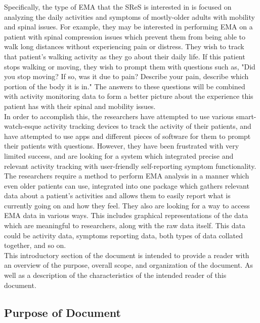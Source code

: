 \documentclass[12pt]{article}
\begin{document}
Specifically, the type of EMA that the SReS is interested in is focused on analyzing the daily activities and symptoms of mostly-older adults with mobility and spinal issues. For example, they may be interested in performing EMA on a patient with spinal compression issues which prevent them from being able to walk long distances without experiencing pain or distress. They wish to track that patient's walking activity as they go about their daily life. If this patient stops walking or moving, they wish to prompt them with questions such as, "Did you stop moving? If so, was it due to pain? Describe your pain, describe which portion of the body it is in." The answers to these questions will be combined with activity monitoring data to form a better picture about the experience this patient has with their spinal and mobility issues.\\

In order to accomplish this, the researchers have attempted to use various smart-watch-esque activity tracking devices to track the activity of their patients, and have attempted to use apps and different pieces of software for them to prompt their patients with questions. However, they have been frustrated with very limited success, and are looking for a system which integrated precise and relevant activity tracking with user-friendly self-reporting symptom functionality.\\

The researchers require a method to perform EMA analysis in a manner which even older patients can use, integrated into one package which gathers relevant data about a patient's activities and allows them to easily report what is currently going on and how they feel. They also are looking for a way to access EMA data in various ways. This includes graphical representations of the data which are meaningful to researchers, along with the raw data itself. This data could be activity data, symptoms reporting data, both types of data collated together, and so on. \\


This introductory section of the document is intended to provide a reader with an overview of the purpose, overall scope, and organization of the document. As well as a description of the characteristics of the intended reader of this document.\\

\subsection{Purpose of Document}
\end{document}
